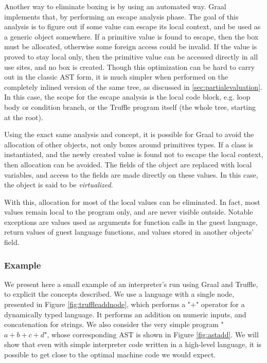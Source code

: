 \documentclass[twoside,11pt,a4paper]{article}
\begin{document}
Another way to eliminate boxing is by using an automated way. Graal implements that, by performing an escape analysis phase. The goal of this analysis is to figure out if some value can escape its local context, and be used as a generic object somewhere. If a primitive value is found to escape, then the box must be allocated, otherwise some foreign access could be invalid. If the value is proved to stay local only, then the primitive value can be accessed directly in all use sites, and no box is created. Though this optimization can be hard to carry out in the classic AST form, it is much simpler when performed on the completely inlined version of the same tree, as discussed in \ref{sec:partialevaluation}. In this case, the scope for the escape analysis is the local code block, e.g. loop body or condition branch, or the Truffle program itself (the whole tree, starting at the root).

Using the exact same analysis and concept, it is possible for Graal to avoid the allocation of other objects, not only boxes around primitives types. If a class is instantiated, and the newly created value is found not to escape the local context, then allocation can be avoided. The fields of the object are replaced with local variables, and access to the fields are made directly on these values. In this case, the object is said to be \textit{virtualized}.

With this, allocation for most of the local values can be eliminated. In fact, most values remain local to the program only, and are never visible outside. Notable exceptions are values used as arguments for function calls in the guest language, return values of guest language functions, and values stored in another objects' field.

\subsubsection{Example}

We present here a small example of an interpreter's run using Graal and Truffle, to explicit the concepts described. We use a language with a single node, presented in Figure \ref{fig:truffleaddnode}, which performs a "+" operator for a dynamically typed language. It performs an addition on numeric inputs, and concatenation for strings. We also consider the very simple program "$a + b + c + d$", whose corresponding AST is shown in Figure \ref{fig:astadd}. We will show that even with simple interpreter code written in a high-level language, it is possible to get close to the optimal machine code we would expect.
\end{document}
